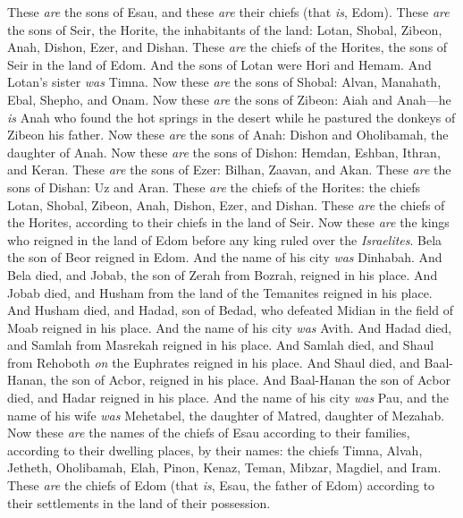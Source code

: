 \begin{biblechapter}
\verse These \textit{are} the sons of Esau, and these \textit{are} their chiefs (that \textit{is}, Edom).
\verse These \textit{are} the sons of Seir, the Horite, the inhabitants of the land: Lotan, Shobal, Zibeon, Anah,
\verse Dishon, Ezer, and Dishan. These \textit{are} the chiefs of the Horites, the sons of Seir in the land of Edom.
\verse And the sons of Lotan were Hori and Hemam. And Lotan’s sister \textit{was} Timna.
\verse Now these \textit{are} the sons of Shobal: Alvan, Manahath, Ebal, Shepho, and Onam.
\verse Now these \textit{are} the sons of Zibeon: Aiah and Anah—he \textit{is} Anah who found the hot springs in the desert while he pastured the donkeys of Zibeon his father.
\verse Now these \textit{are} the sons of Anah: Dishon and Oholibamah, the daughter of Anah.
\verse Now these \textit{are} the sons of Dishon: Hemdan, Eshban, Ithran, and Keran.
\verse These \textit{are} the sons of Ezer: Bilhan, Zaavan, and Akan.
\verse These \textit{are} the sons of Dishan: Uz and Aran.
\verse These \textit{are} the chiefs of the Horites: the chiefs Lotan, Shobal, Zibeon, Anah,
\verse Dishon, Ezer, and Dishan. These \textit{are} the chiefs of the Horites, according to their chiefs in the land of Seir.
 Now these \textit{are} the kings who reigned in the land of Edom before any king ruled over the \textit{Israelites}.
\verse Bela the son of Beor reigned in Edom. And the name of his city \textit{was} Dinhabah.
\verse And Bela died, and Jobab, the son of Zerah from Bozrah, reigned in his place.
\verse And Jobab died, and Husham from the land of the Temanites reigned in his place.
\verse And Husham died, and Hadad, son of Bedad, who defeated Midian in the field of Moab reigned in his place. And the name of his city \textit{was} Avith.
\verse And Hadad died, and Samlah from Masrekah reigned in his place.
\verse And Samlah died, and Shaul from Rehoboth \textit{on} the Euphrates reigned in his place.
\verse And Shaul died, and Baal-Hanan, the son of Acbor, reigned in his place.
\verse And Baal-Hanan the son of Acbor died, and Hadar reigned in his place. And the name of his city \textit{was} Pau, and the name of his wife \textit{was} Mehetabel, the daughter of Matred, daughter of Mezahab.
\verse Now these \textit{are} the names of the chiefs of Esau according to their families, according to their dwelling places, by their names: the chiefs Timna, Alvah, Jetheth,
\verse Oholibamah, Elah, Pinon,
\verse Kenaz, Teman, Mibzar,
\verse Magdiel, and Iram. These \textit{are} the chiefs of Edom (that \textit{is}, Esau, the father of Edom) according to their settlements in the land of their possession.
\end{biblechapter}

